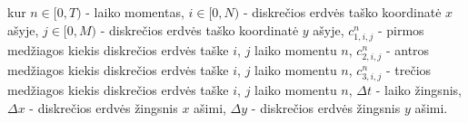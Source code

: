 kur $n\in[0, T)$ - laiko momentas, 
$i\in[0,N)$ - diskrečios erdvės taško koordinatė $x$ ašyje,
$j\in[0,M)$ - diskrečios erdvės taško koordinatė $y$ ašyje,
$c^n_{1,i,j}$ - pirmos medžiagos kiekis diskrečios erdvės taške $i$, $j$ laiko momentu $n$,
$c^n_{2,i,j}$ - antros medžiagos kiekis diskrečios erdvės taške $i$, $j$ laiko momentu $n$,
$c^n_{3,i,j}$ - trečios medžiagos kiekis diskrečios erdvės taške $i$, $j$ laiko momentu $n$,
$\Delta t$ - laiko žingsnis,
$\Delta x$ - diskrečios erdvės žingsnis $x$ ašimi,
$\Delta y$ - diskrečios erdvės žingsnis $y$ ašimi.